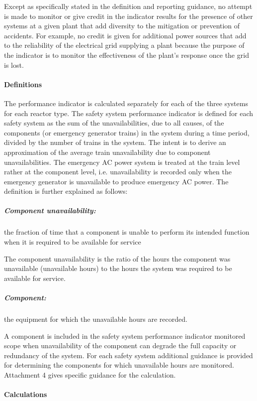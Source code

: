 Except as specifically stated in the definition and reporting
guidance, no attempt is made to monitor or give credit in the
indicator results for the presence of other systems at a given plant
that add diversity to the mitigation or prevention of accidents. For
example, no credit is given for additional power sources that add to
the reliability of the electrical grid supplying a plant because the
purpose of the indicator is to monitor the effectiveness of the
plant's response once the grid is lost.

\paragraph{Definitions}

The performance indicator is calculated separately for each of the
three systems for each reactor type. The safety system performance
indicator is defined for each safety system as the sum of the
unavailabilities, due to all causes, of the components (or emergency
generator trains) in the system during a time period, divided by the
number of trains in the system. The intent is to derive an
approximation of the average train unavailability due to component
unavailabilities. The emergency AC power system is treated at the
train level rather at the component level, i.e. unavailability is
recorded only when the emergency generator is unavailable to produce
emergency AC power. The definition is further explained as follows:

\subparagraph{Component unavailability:} the fraction of time that a component is
unable to perform its intended function when it is required to be
available for service

The component unavailability is the ratio of the hours the component
was unavailable (unavailable hours) to the hours the system was
required to be available for service.

\subparagraph{Component:} the equipment for which the unavailable
hours are recorded.

A component is included in the safety system performance indicator
monitored scope when unavailability of the component can degrade the
full capacity or redundancy of the system. For each safety system
additional guidance is provided for determining the components for
which unavailable hours are monitored. Attachment 4 gives specific
guidance for the calculation.

\paragraph{Calculations}

